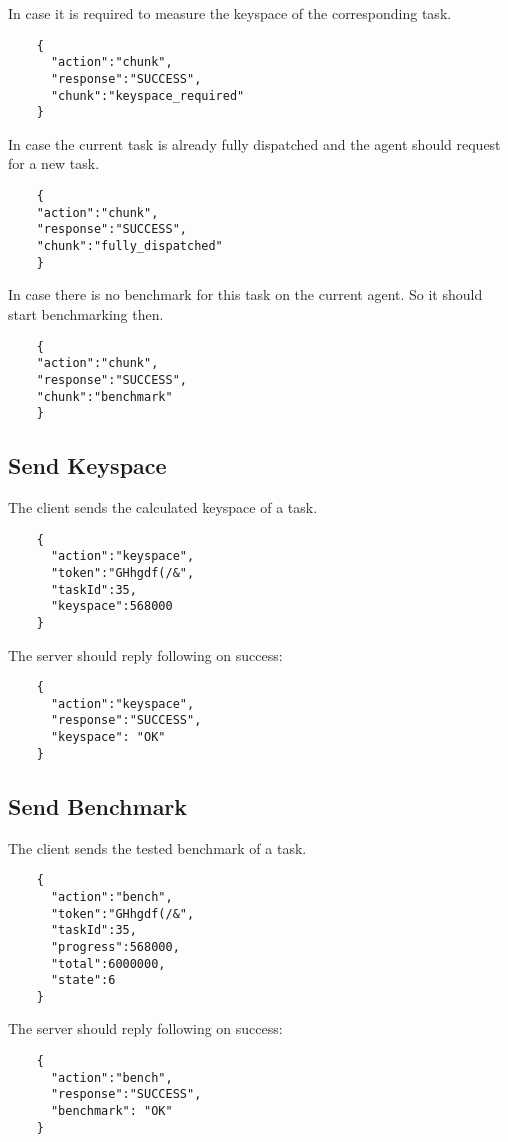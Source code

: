 \documentclass{article}
\begin{document}
	In case it is required to measure the keyspace of the corresponding task.
	\begin{verbatim}
	{
	  "action":"chunk",
	  "response":"SUCCESS",
	  "chunk":"keyspace_required"
	}
	\end{verbatim}
	
	In case the current task is already fully dispatched and the agent should request for a new task.
	\begin{verbatim}
	{
	"action":"chunk",
	"response":"SUCCESS",
	"chunk":"fully_dispatched"
	}
	\end{verbatim}
	
	In case there is no benchmark for this task on the current agent. So it should start benchmarking then.
	\begin{verbatim}
	{
	"action":"chunk",
	"response":"SUCCESS",
	"chunk":"benchmark"
	}
	\end{verbatim}
	
	
	\subsection*{Send Keyspace}
	The client sends the calculated keyspace of a task.
	\begin{verbatim}
	{
	  "action":"keyspace",
	  "token":"GHhgdf(/&",
	  "taskId":35,
	  "keyspace":568000
	}
	\end{verbatim}
	The server should reply following on success:
	\begin{verbatim}
	{
	  "action":"keyspace",
	  "response":"SUCCESS",
	  "keyspace": "OK"
	}
	\end{verbatim}
	
	\subsection*{Send Benchmark}
	The client sends the tested benchmark of a task.
	\begin{verbatim}
	{
	  "action":"bench",
	  "token":"GHhgdf(/&",
	  "taskId":35,
	  "progress":568000,
	  "total":6000000,
	  "state":6
	}
	\end{verbatim}
	The server should reply following on success:
	\begin{verbatim}
	{
	  "action":"bench",
	  "response":"SUCCESS",
	  "benchmark": "OK"
	}
	\end{verbatim}
\end{document}
